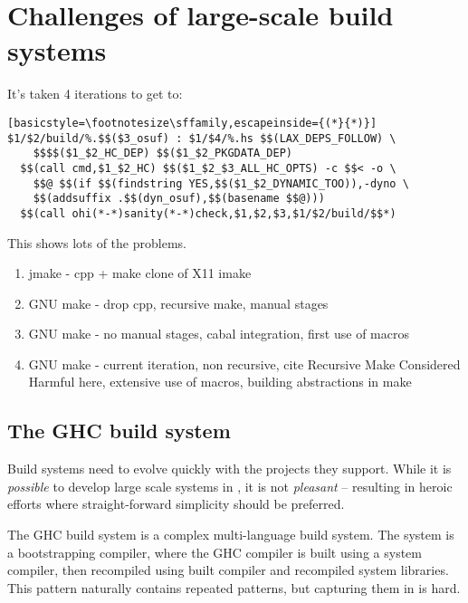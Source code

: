 \section{Challenges of large-scale build systems\label{sec:challenges}}

It's taken 4 iterations to get to:

\begin{lstlisting}[basicstyle=\footnotesize\sffamily,escapeinside={(*}{*)}]
$1/$2/build/%.$$($3_osuf) : $1/$4/%.hs $$(LAX_DEPS_FOLLOW) \
    $$$$($1_$2_HC_DEP) $$($1_$2_PKGDATA_DEP)
  $$(call cmd,$1_$2_HC) $$($1_$2_$3_ALL_HC_OPTS) -c $$< -o \
    $$@ $$(if $$(findstring YES,$$($1_$2_DYNAMIC_TOO)),-dyno \
    $$(addsuffix .$$(dyn_osuf),$$(basename $$@)))
  $$(call ohi(*-*)sanity(*-*)check,$1,$2,$3,$1/$2/build/$$*)
\end{lstlisting}

This shows lots of the problems.



\begin{enumerate}
  \item jmake - cpp + make clone of X11 imake
  \item GNU make - drop cpp, recursive make, manual stages
  \item GNU make - no manual stages, cabal integration, first
   use of macros
   \item GNU make - current iteration, non recursive, cite Recursive
     Make Considered Harmful here, extensive use of macros,
     building abstractions in make
\end{enumerate}

\subsection{The GHC build system}

Build systems need to evolve quickly with the projects they support. While it is
\textit{possible} to develop large scale systems in \make, it is not
\textit{pleasant} -- resulting in heroic efforts where straight-forward
simplicity should be preferred.

The GHC build system is a complex multi-language build system. The system is a
bootstrapping compiler, where the GHC compiler is built using a system compiler,
then recompiled using built compiler and recompiled system libraries. This
pattern naturally contains repeated patterns, but capturing them in \make{} is
hard.

